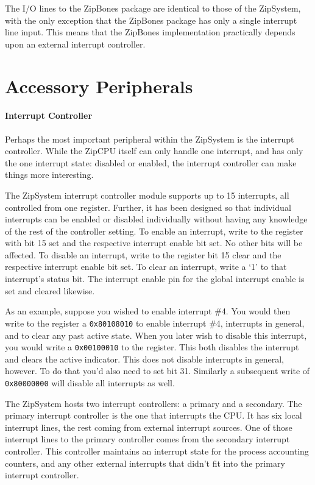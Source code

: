 \documentclass{gqtekspec}
\begin{document}
The I/O lines to the ZipBones package are identical to those of the ZipSystem,
with the only exception that the ZipBones package has only a single interrupt
line input.  This means that the ZipBones implementation practically depends
upon an external interrupt controller.
\chapter{Accessory Peripherals}\label{chap:accessory}
\subsubsection{Interrupt Controller}\label{sec:pic}
Perhaps the most important peripheral within the ZipSystem is the interrupt
controller.  While the ZipCPU itself can only handle one interrupt, and has
only the one interrupt state: disabled or enabled, the interrupt controller
can make things more interesting.

The ZipSystem interrupt controller module supports up to 15 interrupts, all
controlled from one register.  Further, it has been designed so that individual
interrupts can be enabled or disabled individually without having any knowledge
of the rest of the controller setting.  To enable an interrupt, write to the
register with bit 15 set and the respective interrupt
enable bit set.  No other bits will be affected.  To disable an interrupt,
write to the register bit 15 clear and the
respective interrupt enable bit set.  To clear an interrupt, write a `1' to
that interrupt's status bit.  The interrupt enable pin for the global interrupt
enable is set and cleared likewise.

As an example, suppose you wished to enable interrupt \#4.  You would then
write to the register a {\tt 0x80108010} to enable interrupt \#4, interrupts
in general, and to clear any past active state.  When you later wish to disable
this interrupt, you would write a {\tt 0x00100010} to the register.  This both
disables the interrupt and clears the active indicator.  This does not
disable interrupts in general, however.  To do that you'd also need to set
bit 31.  Similarly a subsequent write of {\tt 0x80000000} will disable all
interrupts as well.

The ZipSystem hosts two interrupt controllers: a primary and a secondary.  The
primary interrupt controller is the one that interrupts the CPU.  It has
six local interrupt lines, the rest coming from external interrupt sources.
One of those interrupt lines to the primary controller comes from the secondary
interrupt controller.  This controller maintains an interrupt state for the
process accounting counters, and any other external interrupts that didn't fit
into the primary interrupt controller.
\end{document}
